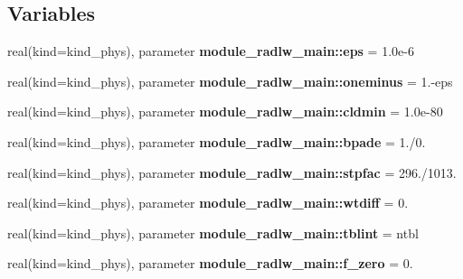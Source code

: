 \subsection*{Variables}
\begin{DoxyCompactItemize}
\item 
\mbox{\label{group__module__radlw__main_gac82309fd8d0e351ac37b276833a10376}} 
real(kind=kind\+\_\+phys), parameter {\bfseries module\+\_\+radlw\+\_\+main\+::eps} = 1.\+0e-\/6
\item 
\mbox{\label{group__module__radlw__main_ga8c35a92c2a08663ce04bdf9de8717247}} 
real(kind=kind\+\_\+phys), parameter {\bfseries module\+\_\+radlw\+\_\+main\+::oneminus} = 1.-\/eps
\item 
\mbox{\label{group__module__radlw__main_gac55ad4a1ff397794e054be6647bafb73}} 
real(kind=kind\+\_\+phys), parameter {\bfseries module\+\_\+radlw\+\_\+main\+::cldmin} = 1.\+0e-\/80
\item 
\mbox{\label{group__module__radlw__main_ga5c63b9836ad5735dd3d0811ff527c41c}} 
real(kind=kind\+\_\+phys), parameter {\bfseries module\+\_\+radlw\+\_\+main\+::bpade} = 1./0.
\item 
\mbox{\label{group__module__radlw__main_ga483b88df2bdada7ef349d9530f91b762}} 
real(kind=kind\+\_\+phys), parameter {\bfseries module\+\_\+radlw\+\_\+main\+::stpfac} = 296./1013.
\item 
\mbox{\label{group__module__radlw__main_gaf1a0ca36bfce779493a7d1a4b81f6f73}} 
real(kind=kind\+\_\+phys), parameter {\bfseries module\+\_\+radlw\+\_\+main\+::wtdiff} = 0.
\item 
\mbox{\label{group__module__radlw__main_gaf6b84954042db7b1e2a6abdb4d401ccf}} 
real(kind=kind\+\_\+phys), parameter {\bfseries module\+\_\+radlw\+\_\+main\+::tblint} = ntbl
\item 
\mbox{\label{group__module__radlw__main_ga9b8f65236249b31c8f9fcf1cfd0e7baa}} 
real(kind=kind\+\_\+phys), parameter {\bfseries module\+\_\+radlw\+\_\+main\+::f\+\_\+zero} = 0.

\end{DoxyCompactItemize}
